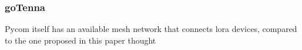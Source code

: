 			\subsubsection{goTenna}
				
						
			
			
		
			Pycom itself has an available mesh network that connects lora devices, compared to the one proposed in this paper thought
			
